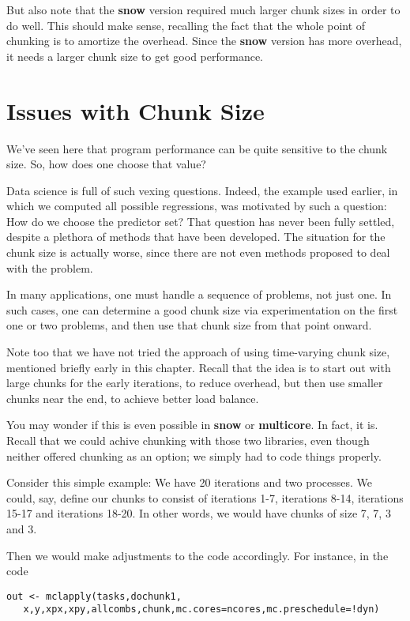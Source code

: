 But also note that the {\bf snow} version required much larger chunk
sizes in order to do well.  This should make sense, recalling the fact
that  the whole point of chunking is to amortize the overhead.  Since
the {\bf snow} version has more overhead, it needs a larger chunk size
to get good performance.

\section{Issues with Chunk Size}

We've seen here that program performance can be quite sensitive to the
chunk size.  So, how does one choose that value?

Data science is full of such vexing questions.  Indeed, the example used
earlier, in which we computed all possible regressions, was motivated by
such a question:  How do we choose the predictor set?  That question has
never been fully settled, despite a plethora of methods that have been
developed.  The situation for the chunk size is actually worse, since
there are not even methods proposed to deal with the problem.

In many applications, one must handle a sequence of problems, not just
one.  In such cases, one can determine a good chunk size via
experimentation on the first one or two problems, and then use that
chunk size from that point onward.

Note too that we have not tried the approach of using time-varying chunk
size, mentioned briefly early in this chapter.  Recall that the idea is
to start out with large chunks for the early iterations, to reduce
overhead, but then use smaller chunks near the end, to achieve better
load balance.

You may wonder if this is even possible in {\bf snow} or {\bf
multicore}.  In fact, it is.  Recall that we could achive chunking with
those two libraries, even though neither offered chunking as an option;
we simply had to code things properly.

Consider this simple example:  We have 20 iterations and two processes.
We could, say, define our chunks to consist of iterations 1-7,
iterations 8-14, iterations 15-17 and iterations 18-20.  In other words,
we would have chunks of size 7, 7, 3 and 3.  

Then we would make adjustments to the code accordingly.  For instance,
in the code

\begin{lstlisting}
out <- mclapply(tasks,dochunk1,
   x,y,xpx,xpy,allcombs,chunk,mc.cores=ncores,mc.preschedule=!dyn)
\end{lstlisting}

